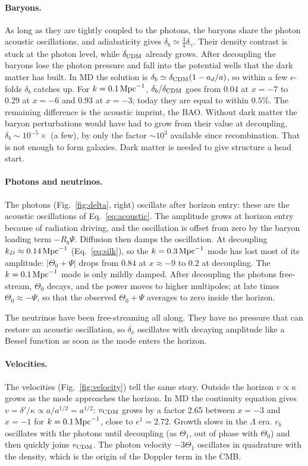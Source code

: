 \paragraph*{Baryons.} As long as they are tightly coupled to the photons, the baryons share the photon acoustic
oscillations, and adiabaticity gives $\delta_b\simeq\frac34\delta_\gamma$. Their density contrast is stuck at the photon
level, while $\delta_{\rm CDM}$ already grows. After decoupling the baryons lose the photon pressure and fall into the
potential wells that the dark matter has built. In MD the solution is $\delta_b\simeq\delta_{\rm CDM}(1-a_d/a)$, so
within a few $e$-folds $\delta_b$ catches up. For $k=0.1\,\mathrm{Mpc}^{-1}$, $\delta_b/\delta_{\rm CDM}$ goes from $0.04$ at
$x=-7$ to $0.29$ at $x=-6$ and $0.93$ at $x=-3$; today they are equal to within $0.5\%$. The remaining difference is the
acoustic imprint, the BAO. Without dark matter the baryon perturbations would have had to grow from their value at
decoupling, $\delta_b\sim10^{-5}\times$ (a few), by only the factor $\sim10^3$ available since recombination. That is
not enough to form galaxies. Dark matter is needed to give structure a head start.

\paragraph*{Photons and neutrinos.} The photons (Fig.~\ref{fig:delta}, right) oscillate after horizon entry: these
are the acoustic oscillations of Eq.~\eqref{eq:acoustic}. The amplitude grows at horizon entry because of radiation
driving, and the oscillation is offset from zero by the baryon loading term $-R_b\Psi$. Diffusion then damps the
oscillation. At decoupling $k_D\approx0.14\,\mathrm{Mpc}^{-1}$ (Eq.~\ref{eq:silk}), so the $k=0.3\,\mathrm{Mpc}^{-1}$ mode has lost most
of its amplitude: $|\Theta_0+\Psi|$ drops from $0.84$ at $x\approx-9$ to $0.2$ at decoupling. The $k=0.1\,\mathrm{Mpc}^{-1}$ mode
is only mildly damped. After decoupling the photons free-stream, $\Theta_0$ decays, and the power moves to higher
multipoles; at late times $\Theta_0\approx-\Psi$, so that the observed
$\Theta_0+\Psi$ averages to zero inside the horizon.

The neutrinos have been free-streaming all along. They have no pressure that can restore an acoustic oscillation, so
$\delta_\nu$ oscillates with decaying amplitude like a Bessel function as soon as the mode enters the horizon.

\paragraph*{Velocities.} The velocities (Fig.~\ref{fig:velocity}) tell the same story. Outside the horizon
$v\propto\kappa$ grows as the mode approaches the horizon. In MD the continuity equation gives $v=\delta'/\kappa
\propto a/a^{1/2}=a^{1/2}$: $v_{\rm CDM}$ grows by a factor 2.65 between $x=-3$ and $x=-1$ for $k=0.1\,\mathrm{Mpc}^{-1}$, close to
$e^{1}=2.72$. Growth slows in the $\Lambda$ era. $v_b$ oscillates with the photons until decoupling (as $\Theta_1$, out
of phase with $\Theta_0$) and then quickly joins $v_{\rm CDM}$. The photon velocity $-3\Theta_1$ oscillates in
quadrature with the density, which is the origin of the Doppler term in the CMB.

